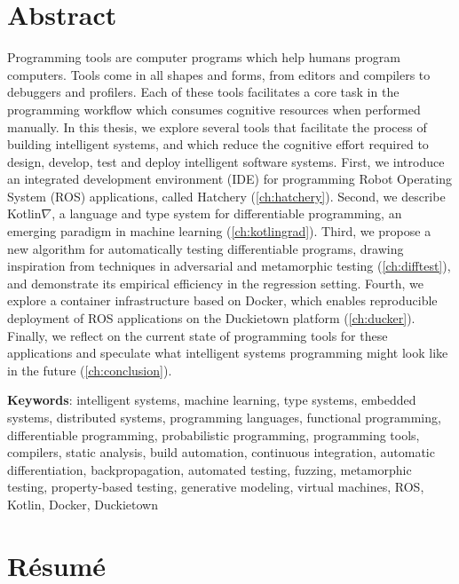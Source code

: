 \chapter*{Abstract}

Programming tools are computer programs which help humans program computers. Tools come in all shapes and forms, from editors and compilers to debuggers and profilers. Each of these tools facilitates a core task in the programming workflow which consumes cognitive resources when performed manually. In this thesis, we explore several tools that facilitate the process of building intelligent systems, and which reduce the cognitive effort required to design, develop, test and deploy intelligent software systems. First, we introduce an integrated development environment (IDE) for programming Robot Operating System (ROS) applications, called Hatchery (\autoref{ch:hatchery}). Second, we describe Kotlin$\nabla$, a language and type system for differentiable programming, an emerging paradigm in machine learning (\autoref{ch:kotlingrad}). Third, we propose a new algorithm for automatically testing differentiable programs, drawing inspiration from techniques in adversarial and metamorphic testing (\autoref{ch:difftest}), and demonstrate its empirical efficiency in the regression setting. Fourth, we explore a container infrastructure based on Docker, which enables reproducible deployment of ROS applications on the Duckietown platform (\autoref{ch:ducker}). Finally, we reflect on the current state of programming tools for these applications and speculate what intelligent systems programming might look like in the future (\autoref{ch:conclusion}).

\noindent\textbf{Keywords}: intelligent systems, machine learning, type systems, embedded systems, distributed systems, programming languages, functional programming, differentiable programming, probabilistic programming, programming tools, compilers, static analysis, build automation, continuous integration, automatic differentiation, backpropagation, automated testing, fuzzing, metamorphic testing, property-based testing, generative modeling, virtual machines, ROS, Kotlin, Docker, Duckietown

\chapter*{R\'esum\'e}

